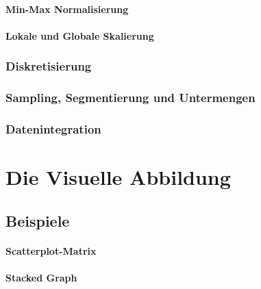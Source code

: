                 \paragraph{Min-Max Normalisierung} %

                \paragraph{Lokale und Globale Skalierung} %

            \subsubsection{Diskretisierung} %

            \subsubsection{Sampling, Segmentierung und Untermengen} %

            \subsubsection{Datenintegration} %

    \section{Die Visuelle Abbildung} %

        \subsection{Beispiele} %

                \paragraph{Scatterplot-Matrix} %

                \paragraph{Stacked Graph} %

